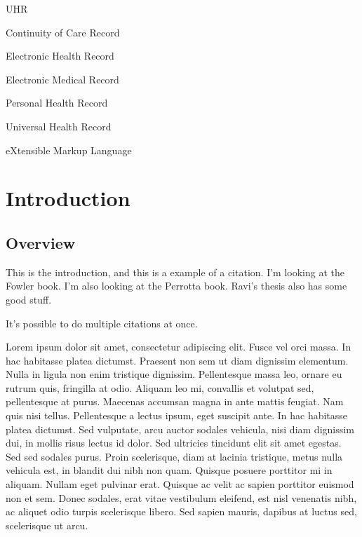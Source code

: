 \documentclass[botnum,fleqn,final]{unmeethesis}
\begin{document}
\tableofcontents
\listoffigures
\listoftables

\begin{glossary}{UHR}
   \item[CCR] Continuity of Care Record
   \item[EHR] Electronic Health Record
   \item[EMR] Electronic Medical Record
   \item[PHR] Personal Health Record
   \item[UHR] Universal Health Record
   \item[XML] eXtensible Markup Language
\end{glossary}

\mainmatter

\chapter{\label{chapter:intro}Introduction}

\section{\label{section:intro:overview}Overview}

This is the introduction, and this is a example of a citation.\cite{JaJa:1992}
I'm looking at the Fowler book.\cite{Fowler:2003} I'm also looking at the
Perrotta book.\cite{Perrotta:2010}  Ravi's thesis also has some good
stuff.\cite{Ravi:2011}

It's possible to do multiple citations at once.\cite{Fowler:2003,Perrotta:2010}

Lorem ipsum dolor sit amet, consectetur adipiscing elit. Fusce vel orci massa.
In hac habitasse platea dictumst. Praesent non sem ut diam dignissim elementum.
Nulla in ligula non enim tristique dignissim. Pellentesque massa leo, ornare eu
rutrum quis, fringilla at odio. Aliquam leo mi, convallis et volutpat sed,
pellentesque at purus. Maecenas accumsan magna in ante mattis feugiat. Nam quis
nisi tellus. Pellentesque a lectus ipsum, eget suscipit ante. In hac habitasse
platea dictumst. Sed vulputate, arcu auctor sodales vehicula, nisi diam
dignissim dui, in mollis risus lectus id dolor. Sed ultricies tincidunt elit
sit amet egestas. Sed sed sodales purus. Proin scelerisque, diam at lacinia
tristique, metus nulla vehicula est, in blandit dui nibh non quam. Quisque
posuere porttitor mi in aliquam. Nullam eget pulvinar erat. Quisque ac velit ac
sapien porttitor euismod non et sem. Donec sodales, erat vitae vestibulum
eleifend, est nisl venenatis nibh, ac aliquet odio turpis scelerisque libero.
Sed sapien mauris, dapibus at luctus sed, scelerisque ut arcu.
\end{document}
